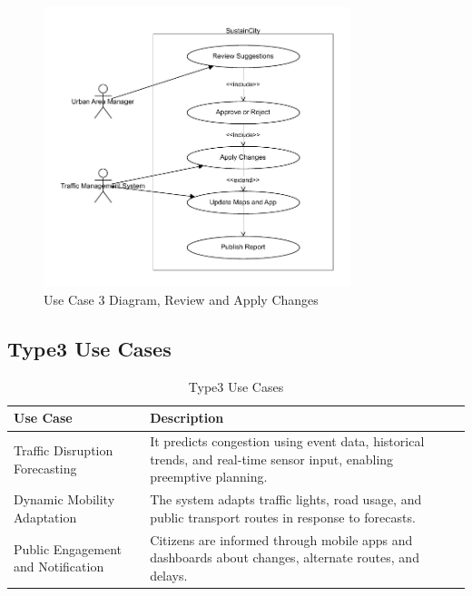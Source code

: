 \documentclass[a4paper,12pt]{article}
\begin{document}
\begin{figure}[h]
    \centering
    \includegraphics[width=0.8\textwidth]{diagrams/Review_and_Apply_Changes.drawio.pdf}
    \caption{Use Case 3 Diagram, Review and Apply Changes}
    \label{fig:Review_and_Apply_Changes.drawio}
\end{figure}


\newpage

\subsection*{Type3 Use Cases}
\begin{table}[h!]
\centering
\begin{tabular}{|p{4.5cm}|p{8.5cm}|}
\hline
\textbf{Use Case} & \textbf{Description} \\
\hline
Traffic Disruption Forecasting & It predicts congestion using event data, historical trends, and real-time sensor input, enabling preemptive planning. \\
\hline
Dynamic Mobility Adaptation & The system adapts traffic lights, road usage, and public transport routes in response to forecasts. \\
\hline
Public Engagement and Notification & Citizens are informed through mobile apps and dashboards about changes, alternate routes, and delays. \\
\hline
\end{tabular}
\caption{Type3 Use Cases}
\end{table}
\end{document}
